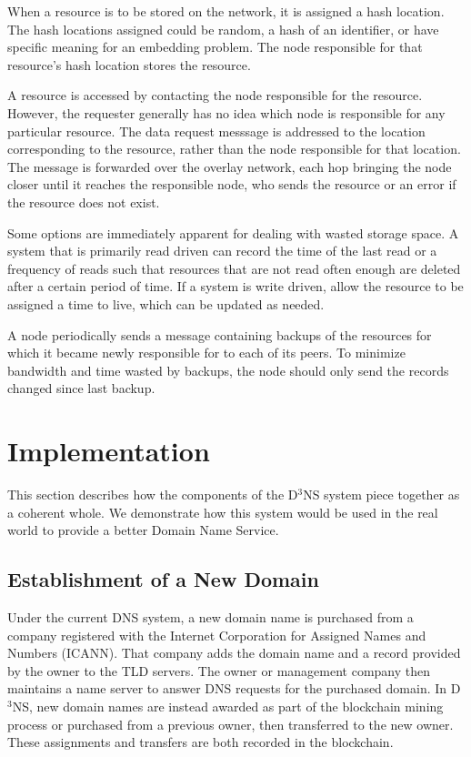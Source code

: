 \documentclass[11pt]{IEEEtran} %
\begin{document}
When a resource is to be stored on the network, it is assigned a hash location. The hash locations assigned could be random, a hash of an identifier, or have specific meaning for an embedding problem. The node responsible for that resource's hash location stores the resource.

A resource is accessed by contacting the node responsible for the resource.  However, the requester generally has no idea which node is responsible for any particular resource.  The data request messsage is addressed to the location corresponding to the resource, rather than the node responsible for that location.  The message is forwarded over the overlay network, each hop bringing the node closer until it reaches the responsible node, who sends the resource or an error if the resource does not exist.

Some options are immediately apparent for dealing with wasted storage space. A system that is primarily read driven can record the time of the last read or a frequency of reads such that resources that are not read often enough are deleted after a certain period of time. If a system is write driven, allow the resource to be assigned a time to live, which can be updated as needed.

A node periodically sends a message containing backups of the resources for which it became newly responsible for to each of its peers. To minimize bandwidth and time wasted by backups, the node should only send the records changed since last backup.



\section{Implementation}
This section describes how the components of the D$^3$NS system piece together as a coherent whole.  We demonstrate how this system would be used in the real world to provide a better Domain Name Service.


\subsection{Establishment of a New Domain}
Under the current DNS system, a new domain name is purchased from a company registered with the Internet Corporation for Assigned Names and Numbers (ICANN). That company adds the domain name and a record provided by the owner to the TLD servers. The owner or management company then maintains a name server to answer DNS requests for the purchased domain. In D$^{3}$NS, new domain names are instead awarded as part of the blockchain mining process or purchased from a previous owner, then transferred to the new owner. These assignments and transfers are both recorded in the blockchain. 
\end{document}
